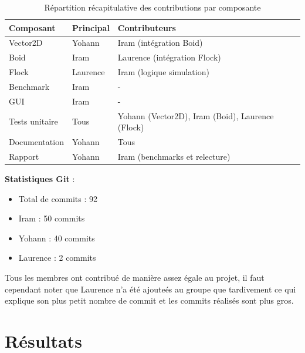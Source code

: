 \documentclass[11pt,a4paper]{article}
\begin{document}
\begin{table}[h]
    \centering
    \begin{tabular}{|p{3.5cm}|p{2.5cm}|p{4cm}|}
        \hline
        \textbf{Composant} & \textbf{Principal} & \textbf{Contributeurs} \\
        \hline
        Vector2D & Yohann & Iram (intégration Boid) \\
        \hline
        Boid & Iram & Laurence (intégration Flock) \\
        \hline
        Flock & Laurence & Iram (logique simulation) \\
        \hline
        Benchmark & Iram & - \\
        \hline
        GUI & Iram & - \\
        \hline
        Tests unitaire & Tous & Yohann (Vector2D), Iram (Boid), Laurence (Flock) \\
        \hline
        Documentation & Yohann & Tous \\
        \hline
        Rapport & Yohann & Iram (benchmarks et relecture) \\
        \hline
    \end{tabular}
    \caption{Répartition récapitulative des contributions par composante}
    \label{tab:repartition}
\end{table}

\textbf{Statistiques Git} :
\begin{itemize}
    \item Total de commits : 92
    \item Iram : 50 commits
    \item Yohann : 40 commits
    \item Laurence : 2 commits
\end{itemize}

Tous les membres ont contribué de manière assez égale au projet, il faut cependant noter que Laurence n'a été ajouteés au groupe que tardivement ce qui explique son plus petit nombre de commit et les commits réalisés sont plus gros.

\section{Résultats}
\end{document}
